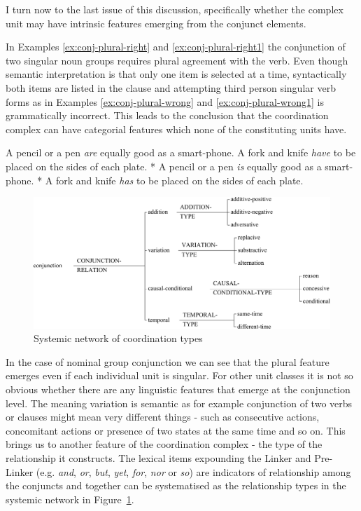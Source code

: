 I turn now to the last issue of this discussion, specifically whether the complex unit may have intrinsic features emerging from the conjunct elements. 

In Examples \ref{ex:conj-plural-right} and \ref{ex:conj-plural-right1} the conjunction of two singular noun groups requires plural agreement with the verb. Even though semantic interpretation is that only one item is selected at a time, syntactically both items are listed in the clause and attempting third person singular verb forms as in Examples \ref{ex:conj-plural-wrong} and \ref{ex:conj-plural-wrong1} is grammatically incorrect. This leads to the conclusion that the coordination complex can have categorial features which none of the constituting units have. 

\begin{exe}
	\ex\label{ex:conj-plural-right}
	A pencil or a pen \textit{are} equally good as a smart-phone.
	\ex\label{ex:conj-plural-right1} A fork and knife \textit{have} to be placed on the sides of each plate.
	\ex\label{ex:conj-plural-wrong} * A pencil or a pen \textit{is} equally good as a smart-phone.
	\ex\label{ex:conj-plural-wrong1} * A fork and knife \textit{has} to be placed on the sides of each plate.
\end{exe}

\begin{figure}[!h]
	\centering
	\includegraphics[width=\textwidth]{Figures/SFL-grammar/conjunction-system.pdf}
	\caption{Systemic network of coordination types}
	\label{fig:conj-rel-types}
\end{figure}

In the case of nominal group conjunction we can see that the plural feature emerges even if each individual unit is singular. For other unit classes it is not so obvious whether there are any linguistic features that emerge at the conjunction level. The meaning variation is semantic as for example conjunction of two verbs or clauses might mean very different things - such as consecutive actions, concomitant actions or presence of two states at the same time and so on. This brings us to another feature of the coordination complex - the type of the relationship it constructs. The lexical items expounding the Linker and Pre-Linker (e.g. \textit{and}, \textit{or}, \textit{but}, \textit{yet}, \textit{for}, \textit{nor} or \textit{so}) are indicators of relationship among the conjuncts and together can be systematised as the relationship types in the systemic network in \mbox{Figure \ref{fig:conj-rel-types}}.

